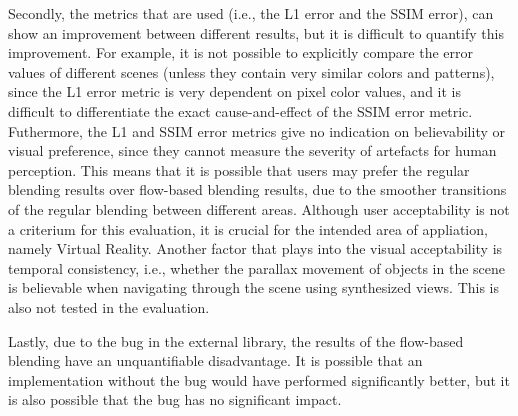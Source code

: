 Secondly, the metrics that are used (i.e., the L1 error and the SSIM error), can show an improvement between different results, but it is difficult to quantify this improvement. For example, it is not possible to explicitly compare the error values of different scenes (unless they contain very similar colors and patterns), since the L1 error metric is very dependent on pixel color values, and it is difficult to differentiate the exact cause-and-effect of the SSIM error metric. Futhermore, the L1 and SSIM error metrics give no indication on believability or visual preference, since they cannot measure the severity of artefacts for human perception. This means that it is possible that users may prefer the regular blending results over flow-based blending results, due to the smoother transitions of the regular blending between different areas. Although user acceptability is not a criterium for this evaluation, it is crucial for the intended area of appliation, namely Virtual Reality. Another factor that plays into the visual acceptability is temporal consistency, i.e., whether the parallax movement of objects in the scene is believable when navigating through the scene using synthesized views. This is also not tested in the evaluation.

Lastly, due to the bug in the external library, the results of the flow-based blending have an unquantifiable disadvantage. It is possible that an implementation without the bug would have performed significantly better, but it is also possible that the bug has no significant impact.

